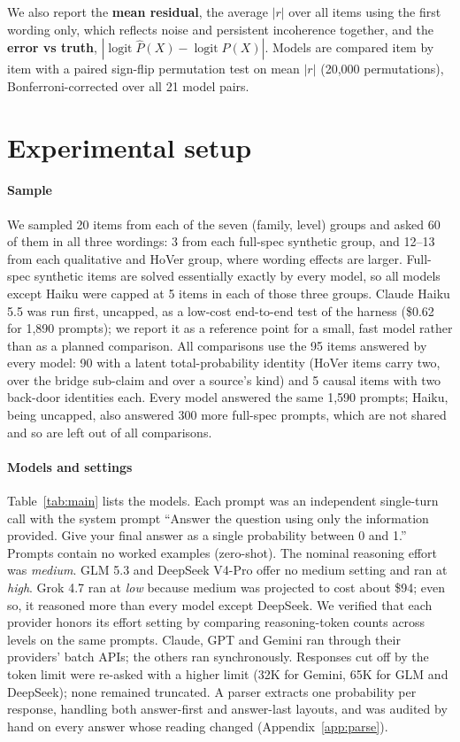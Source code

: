 \documentclass[11pt]{article}
\newcommand{\phat}{\hat{P}}
\newcommand{\logit}{\operatorname{logit}}
\begin{document}
We also report the \textbf{mean residual}, the average $|r|$ over all items using the first wording only, which reflects noise and persistent incoherence together, and the \textbf{error vs truth}, $|\logit\phat(X)-\logit P(X)|$. Models are compared item by item with a paired sign-flip permutation test on mean $|r|$ (20,000 permutations), Bonferroni-corrected over all 21 model pairs.

\section{Experimental setup}

\paragraph{Sample} We sampled 20 items from each of the seven (family, level) groups and asked 60 of them in all three wordings: 3 from each full-spec synthetic group, and 12--13 from each qualitative and HoVer group, where wording effects are larger. Full-spec synthetic items are solved essentially exactly by every model, so all models except Haiku were capped at 5 items in each of those three groups. Claude Haiku 5.5 was run first, uncapped, as a low-cost end-to-end test of the harness (\$0.62 for 1,890 prompts); we report it as a reference point for a small, fast model rather than as a planned comparison. All comparisons use the 95 items answered by every model: 90 with a latent total-probability identity (HoVer items carry two, over the bridge sub-claim and over a source's kind) and 5 causal items with two back-door identities each. Every model answered the same 1,590 prompts; Haiku, being uncapped, also answered 300 more full-spec prompts, which are not shared and so are left out of all comparisons.

\paragraph{Models and settings} Table~\ref{tab:main} lists the models. Each prompt was an independent single-turn call with the system prompt ``Answer the question using only the information provided. Give your final answer as a single probability between 0 and 1.'' Prompts contain no worked examples (zero-shot). The nominal reasoning effort was \emph{medium}. GLM 5.3 and DeepSeek V4-Pro offer no medium setting and ran at \emph{high}. Grok 4.7 ran at \emph{low} because medium was projected to cost about \$94; even so, it reasoned more than every model except DeepSeek. We verified that each provider honors its effort setting by comparing reasoning-token counts across levels on the same prompts. Claude, GPT and Gemini ran through their providers' batch APIs; the others ran synchronously. Responses cut off by the token limit were re-asked with a higher limit (32K for Gemini, 65K for GLM and DeepSeek); none remained truncated. A parser extracts one probability per response, handling both answer-first and answer-last layouts, and was audited by hand on every answer whose reading changed (Appendix~\ref{app:parse}).
\end{document}
